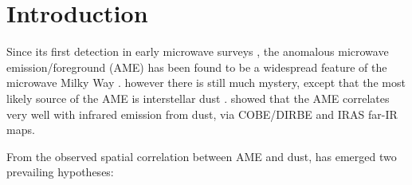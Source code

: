 \documentclass[preprint2,longabstract]{aastex}
\begin{document}
\begin{abstract}
\end{abstract}




\maketitle
\section{Introduction}

     Since its first detection in early microwave surveys , the anomalous microwave emission/foreground (AME) has been found to be a widespread feature of the microwave Milky Way \citep{dickinson13r}.  however there is still much mystery, except that the most likely source of the AME is interstellar dust \citep{ysard10a,tibbs11,hensley16}. \cite{kogut96,deoliveiracosta97,leitch98} showed that the AME correlates very well with infrared emission from dust, via COBE/DIRBE and IRAS far-IR maps.

 From the observed spatial correlation between AME and dust, has emerged two prevailing hypotheses:
\end{document}
